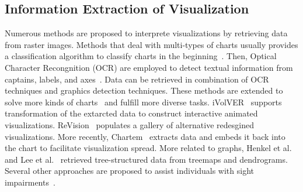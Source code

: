\subsection{Information Extraction of Visualization}
Numerous methods are proposed to interprete visualizations by retrieving data from raster images.
Methods that deal with multi-types of charts usually provides a classification algorithm to classify charts in the beginning~\cite{DBLP:conf/icip/GaoZB12, DBLP:conf/chi/JungKSHLKS17, DBLP:conf/eccv/SiegelHLDF16, DBLP:journals/vlc/DaiWNZ18}.
Then, Optical Character Recongnition (OCR) are employed to detect textual information from captains, labels, and axes~\cite{DBLP:conf/icip/ZhouT00, DBLP:conf/doceng/HuangT07, DBLP:conf/grec/HuangTL03}.
Data can be retrieved in combination of OCR techniques and graphics detection techniques.
These methods are extended to solve more kinds of charts~\cite{DBLP:conf/pkdd/ClicheRMY17, DBLP:conf/uist/SavvaKCFAH11} and fulfill more diverse tasks.
iVolVER~\cite{DBLP:conf/chi/MendezNV16} supports transformation of the extarcted data to construct interactive animated visualizations.
ReVision~\cite{DBLP:conf/uist/SavvaKCFAH11} populates a gallery of alternative redesgined visualizations.
More recently, Chartem~\cite{DBLP:journals/tvcg/FuZCGWZHTZM21} extracts data and embeds it back into the chart to facilitate visualization spread.
More related to graphs, Henkel et al.~\cite{DBLP:conf/vmv/HenkelKLG20} and Lee et al.~\cite{DBLP:conf/icdar/LeeYWH17} retrieved tree-structured data from treemaps and dendrograms.
Several other approaches are proposed to assist individuals with sight impairments~\cite{DBLP:conf/ismis/ChesterE05, DBLP:journals/tiis/CarberrySMDWGCSOM12, DBLP:journals/cgf/ChoiJPCE19}.

